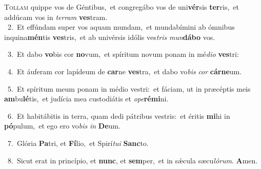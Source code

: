 \lettrine{\initial\textcolor{\initialcolor}{T}}{ollam} quippe vos de Géntibus,~\dagger et congregábo vos de uni\-\textbf{vér}\-sis \textbf{ter}\-ris,~\star et addúcam vos in \textit{ter}\-\textit{ram} \textbf{ves}\-tram.\\
{\numbfont\textcolor{\numbcolor}{~2.}}~Et effúndam super vos aquam mundam,~\dagger et mundabímini ab ómnibus inquina\-\textbf{mén}\-tis \textbf{ves}\-tris,~\star et ab univérsis idólis ves\textit{tris} \textit{mun}\-\textbf{dá}\textbf{bo} vos.\par
{\numbfont\textcolor{\numbcolor}{~3.}}~Et dabo \textbf{vo}\-bis cor \textbf{no}\-vum,~\star et spíritum novum ponam in mé\-\textit{di}\-\textit{o} \textbf{ves}\-tri:\par
{\numbfont\textcolor{\numbcolor}{~4.}}~Et áuferam cor lapídeum de \textbf{car}\-ne \textbf{ves}\-tra,~\star et dabo vo\textit{bis} \textit{cor} \textbf{cár}\-\textbf{ne}um.\par
{\numbfont\textcolor{\numbcolor}{~5.}}~Et spíritum meum ponam in médio vestri:~\dagger et fáciam, ut in præcéptis meis \textbf{am}\-bu\-\textbf{lé}\-tis,~\star et judícia mea custodiátis et \textit{o}\-\textit{pe}\textbf{ré}\textbf{mi}ni.\par
{\numbfont\textcolor{\numbcolor}{~6.}}~Et habitábitis in terra, quam dedi pátribus vestris:~\dagger et éritis \textbf{mi}\-hi in \textbf{pó}\-pulum,~\star et ego ero vo\textit{bis} \textit{in} \textbf{De}\-um.\par
{\numbfont\textcolor{\numbcolor}{~7.}}~Glória \textbf{Pa}\-tri, et \textbf{Fí}\-lio,~\star et Spirí\-\textit{tu}\-\textit{i} \textbf{Sanc}\-to.\par
{\numbfont\textcolor{\numbcolor}{~8.}}~Sicut erat in princípio, et \textbf{nunc}\-, et \textbf{sem}\-per,~\star et in sǽcula sæcu\-\textit{ló}\-\textit{rum}. \textbf{A}\-men.\par
